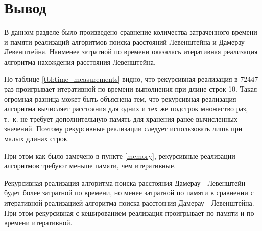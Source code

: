 \clearpage


\section*{Вывод}

В данном разделе было произведено сравнение количества затраченного времени и памяти реализаций алгоритмов поиска расстояний Левенштейна и Дамерау---Левенштейна.
Наименее затратной по времени оказалась итеративная реализация алгоритма нахождения расстояния Левенштейна.

По таблице \ref{tbl:time_measurements} видно, что рекурсивная реализация в 72447 раз проигрывает итеративной по времени выполнения при длине строк 10.
Такая огромная разница может быть объяснена тем, что рекурсивная реализация алгоритма вычисляет расстояния для одних и тех же подстрок множество раз, т.~к. не требует дополнительную память для хранения ранее вычисленных значений.
Поэтому рекурсивные реализации следует использовать лишь при малых длинах строк.

При этом как было замечено в пункте \ref{memory}, рекурсивные реализации алгоритмов требуют меньше памяти, чем итеративные.

Рекурсивная реализация алгоритма поиска расстояния Дамерау---Левенштейн будет более затратной по времени, но менее затратной по памяти в сравнении с итеративной реализацией алгоритма поиска расстояния Дамерау---Левенштейна.
При этом рекурсивная с кешированием реализация проигрывает по памяти и по времени итеративной.